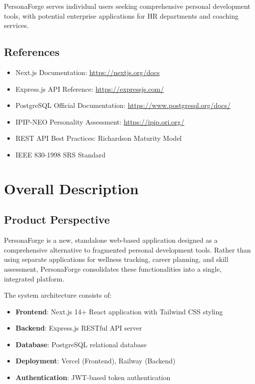 \documentclass[12pt,a4paper]{article}
\begin{document}
PersonaForge serves individual users seeking comprehensive personal development tools, with potential enterprise applications for HR departments and coaching services.

\subsection{References}
\begin{itemize}
    \item Next.js Documentation: \url{https://nextjs.org/docs}
    \item Express.js API Reference: \url{https://expressjs.com/}
    \item PostgreSQL Official Documentation: \url{https://www.postgresql.org/docs/}
    \item IPIP-NEO Personality Assessment: \url{https://ipip.ori.org/}
    \item REST API Best Practices: Richardson Maturity Model
    \item IEEE 830-1998 SRS Standard
\end{itemize}

\newpage
\section{Overall Description}

\subsection{Product Perspective}
PersonaForge is a new, standalone web-based application designed as a comprehensive alternative to fragmented personal development tools. Rather than using separate applications for wellness tracking, career planning, and skill assessment, PersonaForge consolidates these functionalities into a single, integrated platform.

The system architecture consists of:
\begin{itemize}
    \item \textbf{Frontend}: Next.js 14+ React application with Tailwind CSS styling
    \item \textbf{Backend}: Express.js RESTful API server
    \item \textbf{Database}: PostgreSQL relational database
    \item \textbf{Deployment}: Vercel (Frontend), Railway (Backend)
    \item \textbf{Authentication}: JWT-based token authentication
\end{itemize}
\end{document}
